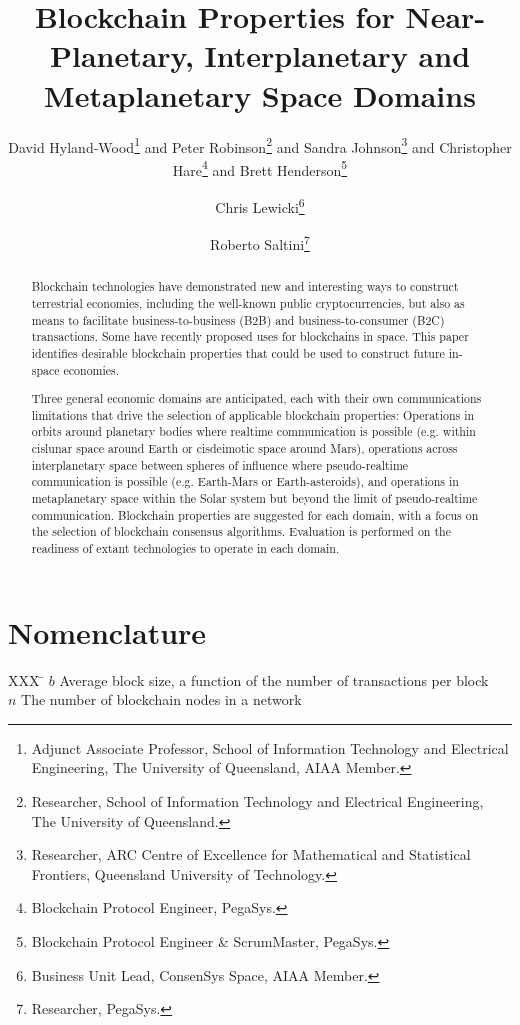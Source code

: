 \documentclass[journal ]{new-aiaa}
\title{Blockchain Properties for Near-Planetary, Interplanetary and Metaplanetary Space Domains}
\author{David Hyland-Wood\footnote{Adjunct Associate Professor, School of Information Technology and Electrical Engineering, The University of Queensland, AIAA Member.}
 and Peter Robinson\footnote{Researcher, School of Information Technology and Electrical Engineering, The University of Queensland.}
and Sandra Johnson\footnote{Researcher, ARC Centre of Excellence for Mathematical and Statistical Frontiers, Queensland University of Technology.}
and Christopher Hare\footnote{Blockchain Protocol Engineer, PegaSys.}
and Brett Henderson\footnote{Blockchain Protocol Engineer \& ScrumMaster, PegaSys.}} %
\affil{PegaSys, ConsenSys AG, Brisbane, QLD, 4000, Australia}
\author{Chris Lewicki\footnote{Business Unit Lead, ConsenSys Space, AIAA Member.}}
\affil{ConsenSys Space, ConsenSys AG, Redmond, WA, 98052, USA}
\author{Roberto Saltini\footnote{Researcher, PegaSys.}}
\affil{PegaSys, ConsenSys AG, Sydney, NSW, 2000, Australia}
\begin{document}
\maketitle

\begin{abstract}
Blockchain technologies have demonstrated new and interesting ways to construct terrestrial economies, including the well-known public cryptocurrencies, but also as means to facilitate business-to-business (B2B) and business-to-consumer (B2C) transactions. Some have recently proposed uses for blockchains in space. This paper identifies desirable blockchain properties that could be used to construct future in-space economies.

Three general economic domains are anticipated, each with their own communications limitations that drive the selection of applicable blockchain properties: Operations in orbits around planetary bodies where realtime communication is possible (e.g. within cislunar space around Earth or cisdeimotic space around Mars), operations across interplanetary space between spheres of influence where pseudo-realtime communication is possible (e.g. Earth-Mars or Earth-asteroids), and operations in metaplanetary space within the Solar system but beyond the limit of pseudo-realtime communication. Blockchain properties are suggested for each domain, with a focus on the selection of blockchain consensus algorithms. Evaluation is performed on the readiness of extant technologies to operate in each domain.
\end{abstract}

\section*{Nomenclature}
\begin{tabbing}
  XXX \= \kill%
  $b$ \> Average block size, a function of the number of transactions per block \\
  $n$ \> The number of blockchain nodes in a network \\
 \end{tabbing}
\end{document}
